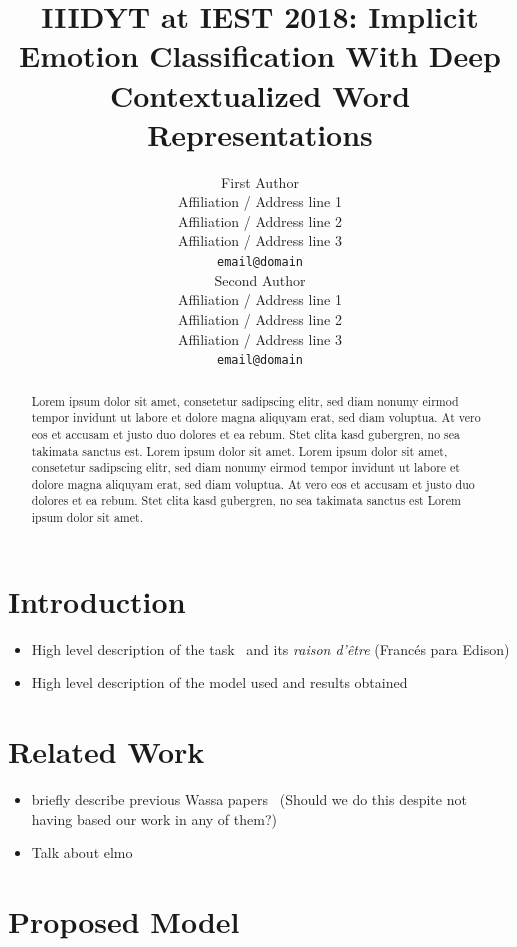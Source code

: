 \documentclass[11pt,a4paper]{article}
\title{IIIDYT at IEST 2018: Implicit Emotion Classification With Deep
Contextualized Word Representations}
\author{First Author \\
  Affiliation / Address line 1 \\
  Affiliation / Address line 2 \\
  Affiliation / Address line 3 \\
  {\tt email@domain} \\
  \And{}
  Second Author \\
  Affiliation / Address line 1 \\
  Affiliation / Address line 2 \\
  Affiliation / Address line 3 \\
  {\tt email@domain} \\}
\date{}
\begin{document}
\maketitle
\begin{abstract}

Lorem ipsum dolor sit amet, consetetur sadipscing elitr, sed diam nonumy eirmod
tempor invidunt ut labore et dolore magna aliquyam erat, sed diam voluptua. At
vero eos et accusam et justo duo dolores et ea rebum. Stet clita kasd gubergren,
no sea takimata sanctus est. Lorem ipsum dolor sit amet. Lorem ipsum dolor sit
amet, consetetur sadipscing elitr, sed diam nonumy eirmod tempor invidunt ut
labore et dolore magna aliquyam erat, sed diam voluptua. At vero eos et accusam
et justo duo dolores et ea rebum. Stet clita kasd gubergren, no sea takimata
sanctus est Lorem ipsum dolor sit amet.

\end{abstract}

\section{Introduction}
\begin{itemize}
    \item High level description of the task~\cite{klinger2018iest} and
          its \textit{raison d'être}
        (Francés para Edison)
    \item High level description of the model used and results obtained
\end{itemize}

\section{Related Work}
\begin{itemize}
    \item briefly describe previous Wassa papers~\cite{baziotis2018ntua,
        duppada2018seernet, abdou2018affecthor} (Should we do this despite not
        having based our work in any of them?)
    \item Talk about elmo~\cite{peters2018deep}
\end{itemize}

\section{Proposed Model}
\end{document}
